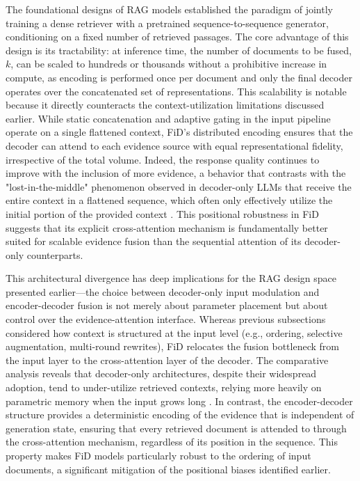 \documentclass[11pt,a4paper]{article}
\begin{document}
The foundational designs of RAG models \cite{arxiv:2005.11401v4} established the paradigm of jointly training a dense retriever with a pretrained sequence-to-sequence generator, conditioning on a fixed number of retrieved passages. The core advantage of this design is its tractability: at inference time, the number of documents to be fused, \(k\), can be scaled to hundreds or thousands without a prohibitive increase in compute, as encoding is performed once per document and only the final decoder operates over the concatenated set of representations. This scalability is notable because it directly counteracts the context-utilization limitations discussed earlier. While static concatenation and adaptive gating in the input pipeline operate on a single flattened context, FiD's distributed encoding ensures that the decoder can attend to each evidence source with equal representational fidelity, irrespective of the total volume. Indeed, the response quality continues to improve with the inclusion of more evidence, a behavior that contrasts with the "lost-in-the-middle" phenomenon observed in decoder-only LLMs that receive the entire context in a flattened sequence, which often only effectively utilize the initial portion of the provided context \cite{arxiv:2407.16833v1}. This positional robustness in FiD suggests that its explicit cross-attention mechanism is fundamentally better suited for scalable evidence fusion than the sequential attention of its decoder-only counterparts.

This architectural divergence has deep implications for the RAG design space presented earlier---the choice between decoder-only input modulation and encoder-decoder fusion is not merely about parameter placement but about control over the evidence-attention interface. Whereas previous subsections considered how context is structured at the input level (e.g., ordering, selective augmentation, multi-round rewrites), FiD relocates the fusion bottleneck from the input layer to the cross-attention layer of the decoder. The comparative analysis reveals that decoder-only architectures, despite their widespread adoption, tend to under-utilize retrieved contexts, relying more heavily on parametric memory when the input grows long \cite{arxiv:2407.16833v1,arxiv:2402.18668v1}. In contrast, the encoder-decoder structure provides a deterministic encoding of the evidence that is independent of generation state, ensuring that every retrieved document is attended to through the cross-attention mechanism, regardless of its position in the sequence. This property makes FiD models particularly robust to the ordering of input documents, a significant mitigation of the positional biases identified earlier.
\end{document}
